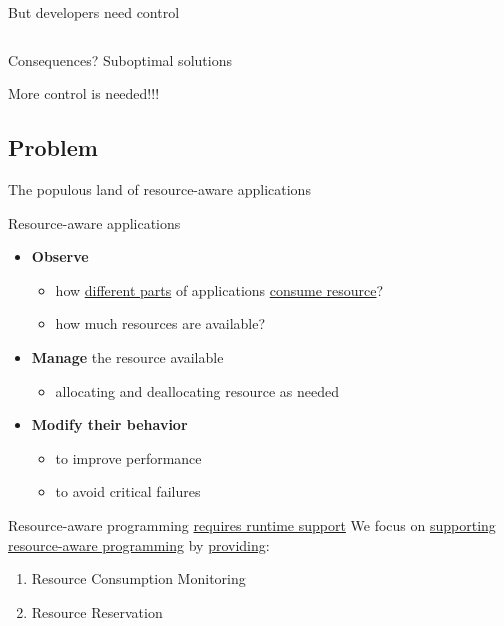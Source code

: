 \documentclass[10pt,xcolor={dvipsnames}]{beamer}
\begin{document}
\begin{frame}{But developers need control}
\begin{footnotesize}
\begin{columns}
		\end{columns}
		\vspace{-.2cm}
		\begin{alertblock}{Consequences? }
			Suboptimal solutions 
			\begin{center}
				{\color{red} More control is needed!!!}
			\end{center}
		\end{alertblock}
		\end{footnotesize}
	\end{frame}
	
	\subsection[Problem]{Problem}
	
	\begin{frame}{The populous land of resource-aware applications}
		\begin{block}{Resource-aware applications}
			\begin{itemize}
				\item \textbf{{Observe}}
				\begin{itemize}
					\item how \underline{different parts} of applications \underline{consume resource}?
					\item how much resources are available?
				\end{itemize}
				\item \textbf{{Manage}} the resource available
				\begin{itemize}
					\item allocating and deallocating resource as needed
				\end{itemize}
				\item \textbf{{Modify their behavior}}
				\begin{itemize}
					\item to improve performance
					\item to avoid critical failures
				\end{itemize}
			\end{itemize}
		\end{block}
		
		\begin{alertblock}{Resource-aware programming \underline{requires runtime support}}
			We focus on \underline{supporting resource-aware programming} by \underline{providing}:
			\begin{enumerate}
				\item Resource Consumption Monitoring
				\item Resource Reservation
			\end{enumerate}
		\end{alertblock}
	\end{frame}
	
\end{document}
